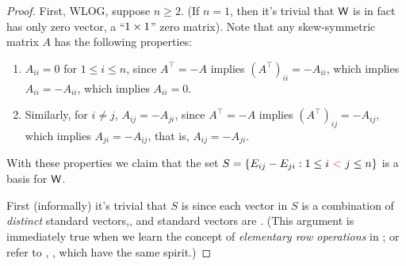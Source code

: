 \begin{proof}
First, WLOG, suppose \(n \ge 2\).
(If \(n = 1\), then it's trivial that \(\textsf{W}\) is in fact has only zero vector, a ``\(1 \times 1\)'' zero matrix).
Note that any skew-symmetric matrix \(A\) has the following properties:
\begin{enumerate}
    \item \(A_{ii} = 0\) for \(1 \le i \le n\), since \(A^\top = -A\) implies \((A^\top)_{ii} = -A_{ii}\), which implies \(A_{ii} = -A_{ii}\), which implies \(A_{ii} = 0\).
    \item Similarly, for \(i \ne j\), \(A_{ij} = -A_{ji}\), since \(A^\top = -A\) implies \((A^\top)_{ij} = -A_{ij}\), which implies \(A_{ji} = -A_{ij}\), that is, \(A_{ij} = -A_{ji}\).
\end{enumerate}
With these properties we claim that the set \(S = \{ E_{ij} - E_{ji} : 1 \le i\ \RED{<}\ j \le n \}\) is a basis for \(\textsf{W}\).

First (informally) it's trivial that \(S\) is \LID{} since each vector in \(S\) is a combination of \emph{distinct} standard vectors,, and standard vectors are \LID{}.
(This argument is immediately true when we learn the concept of \emph{elementary row operations} in ; or refer to , , which have the same spirit.)


\end{proof}
